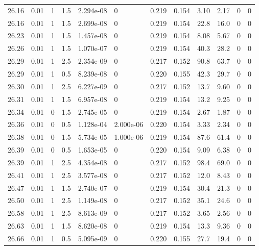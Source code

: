 \documentclass[preview]{standalone}
\begin{document}
{{{{{{{{{{{{\begin{tabular}{L{1.2cm}C{1.2cm} C{0.3cm}C{0.5cm} C{1.4cm}C{1.4cm} C{1.4cm}C{1.4cm} C{1.6cm}C{1.6cm} C{1.6cm}C{1.6cm}}
  26.16  &  0.01  & 1     & 1.5 &  2.294e-08  & 0  &  0.219&   0.154& 3.10 & 2.17   &  0 & 0  \\ 
  26.16  &  0.01  & 1     & 1.5 &  2.699e-08  & 0  &  0.219&   0.154& 22.8 & 16.0   &  0 & 0  \\ 
  26.23  &  0.01  & 1     & 1.5 &  1.457e-08  & 0  &  0.219&   0.154& 8.08 & 5.67   &  0 & 0  \\ 
  26.26  &  0.01  & 1     & 1.5 &  1.070e-07  & 0  &  0.219&   0.154& 40.3 & 28.2   &  0 & 0  \\ 
  26.29  &  0.01  & 1     & 2.5 &  2.354e-09  & 0  &  0.217&   0.152& 90.8 & 63.7   &  0 & 0  \\ 
  26.29  &  0.01  & 1     & 0.5 &  8.239e-08  & 0  &  0.220&   0.155& 42.3 & 29.7   &  0 & 0  \\ 
  26.30  &  0.01  & 1     & 2.5 &  6.227e-09  & 0  &  0.217&   0.152& 13.7 & 9.60   &  0 & 0  \\ 
  26.31  &  0.01  & 1     & 1.5 &  6.957e-08  & 0  &  0.219&   0.154& 13.2 & 9.25   &  0 & 0  \\ 
  26.34  &  0.01  & 0     & 1.5 &  2.745e-05  & 0  &  0.219&   0.154& 2.67 & 1.87   &  0 & 0  \\ 
  26.36  &  0.01  & 0     & 0.5 &  1.128e-04  & 2.000e-06  &  0.220&   0.154& 3.33 & 2.34   &  0 & 0  \\ 
  26.38  &  0.01  & 0     & 1.5 &  5.734e-05  & 1.000e-06  &  0.219&   0.154& 87.6 & 61.4   &  0 & 0  \\ 
  26.39  &  0.01  & 0     & 0.5 &  1.653e-05  & 0  &  0.220&   0.154& 9.09 & 6.38   &  0 & 0  \\ 
  26.39  &  0.01  & 1     & 2.5 &  4.354e-08  & 0  &  0.217&   0.152& 98.4 & 69.0   &  0 & 0  \\ 
  26.41  &  0.01  & 1     & 2.5 &  3.577e-08  & 0  &  0.217&   0.152& 12.0 & 8.43   &  0 & 0  \\ 
  26.47  &  0.01  & 1     & 1.5 &  2.740e-07  & 0  &  0.219&   0.154& 30.4 & 21.3   &  0 & 0  \\ 
  26.50  &  0.01  & 1     & 2.5 &  1.149e-08  & 0  &  0.217&   0.152& 35.1 & 24.6   &  0 & 0  \\ 
  26.58  &  0.01  & 1     & 2.5 &  8.613e-09  & 0  &  0.217&   0.152& 3.65 & 2.56   &  0 & 0  \\ 
  26.63  &  0.01  & 1     & 1.5 &  8.620e-08  & 0  &  0.219&   0.154& 13.3 & 9.36   &  0 & 0  \\ 
  26.66  &  0.01  & 1     & 0.5 &  5.095e-09  & 0  &  0.220&   0.155& 27.7 & 19.4   &  0 & 0  \\ 

\end{tabular}}}}}}}}}}}}}
\end{document}

